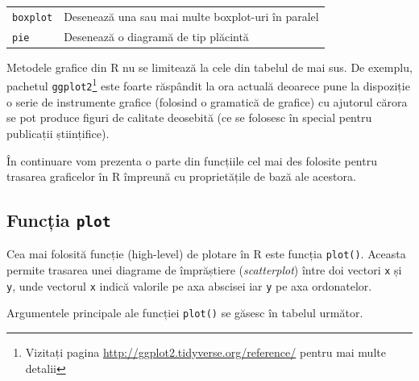 \documentclass[]{article}
\let\rmarkdownfootnote\footnote%
\def\footnote{\protect\rmarkdownfootnote}
\begin{document}
\begin{longtable}[]{@{}ll@{}}
\begin{minipage}[t]{0.37\columnwidth}
\texttt{boxplot}\strut
\end{minipage} & \begin{minipage}[t]{0.34\columnwidth}\raggedright\strut
Desenează una sau mai multe boxplot-uri în paralel\strut
\end{minipage}\tabularnewline
\begin{minipage}[t]{0.37\columnwidth}\raggedright\strut
\texttt{pie}\strut
\end{minipage} & \begin{minipage}[t]{0.34\columnwidth}\raggedright\strut
Desenează o diagramă de tip plăcintă\strut
\end{minipage}\tabularnewline
\bottomrule
\end{longtable}

Metodele grafice din R nu se limitează la cele din tabelul de mai sus.
De exemplu, pachetul \texttt{ggplot2}\footnote{Vizitați pagina
  \url{http://ggplot2.tidyverse.org/reference/} pentru mai multe detalii}
este foarte răspândit la ora actuală deoarece pune la dispoziție o serie
de instrumente grafice (folosind o gramatică de grafice) cu ajutorul
cărora se pot produce figuri de calitate deosebită (ce se folosesc în
special pentru publicații științifice).

În continuare vom prezenta o parte din funcțiile cel mai des folosite
pentru trasarea graficelor în R împreună cu proprietățile de bază ale
acestora.

\subsection{\texorpdfstring{Funcția
\texttt{plot}}{Funcția plot}}\label{functia-plot}

Cea mai folosită funcție (high-level) de plotare în R este funcția
\texttt{plot()}. Aceasta permite trasarea unei diagrame de împrăștiere
(\emph{scatterplot}) între doi vectori \texttt{x} și \texttt{y}, unde
vectorul \texttt{x} indică valorile pe axa abscisei iar \texttt{y} pe
axa ordonatelor.

Argumentele principale ale funcției \texttt{plot()} se găsesc în tabelul
următor.
\end{document}
